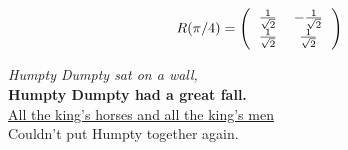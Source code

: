 \documentclass[11pt,letterpaper]{exam}
\begin{document}
	\[ R(\pi/4)=\left(\begin{tabular}{cc}
	 $\frac{1}{\sqrt{2}}$ & $-\frac{1}{\sqrt{2}}$ \\
	 $\frac{1}{\sqrt{2}}$ & $\frac{1}{\sqrt{2}}$ 
	\end{tabular}\right)\]

\newpage

\begin{center}
{\it Humpty Dumpty sat on a wall,}\\
{\bf Humpty Dumpty had a great fall.}\\
\underline{All the king's horses and all the king's men}\\
Couldn't put Humpty together again.
\end{center}
\end{document}
